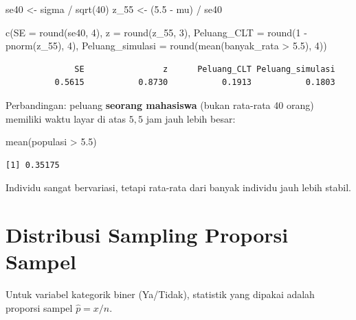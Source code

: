 \documentclass[
  indonesian,
  letterpaper,
]{book}
\newenvironment{Shaded}{\begin{snugshade}}{\end{snugshade}}
\newcommand{\AttributeTok}[1]{\textcolor[rgb]{0.40,0.45,0.13}{#1}}
\newcommand{\DecValTok}[1]{\textcolor[rgb]{0.68,0.00,0.00}{#1}}
\newcommand{\FloatTok}[1]{\textcolor[rgb]{0.68,0.00,0.00}{#1}}
\newcommand{\FunctionTok}[1]{\textcolor[rgb]{0.28,0.35,0.67}{#1}}
\newcommand{\NormalTok}[1]{\textcolor[rgb]{0.00,0.23,0.31}{#1}}
\newcommand{\OtherTok}[1]{\textcolor[rgb]{0.00,0.23,0.31}{#1}}
\newcommand{\SpecialCharTok}[1]{\textcolor[rgb]{0.37,0.37,0.37}{#1}}
\begin{document}
\begin{Shaded}
\begin{Highlighting}[]
\NormalTok{se40 }\OtherTok{\textless{}{-}}\NormalTok{ sigma }\SpecialCharTok{/} \FunctionTok{sqrt}\NormalTok{(}\DecValTok{40}\NormalTok{)}
\NormalTok{z\_55 }\OtherTok{\textless{}{-}}\NormalTok{ (}\FloatTok{5.5} \SpecialCharTok{{-}}\NormalTok{ mu) }\SpecialCharTok{/}\NormalTok{ se40}

\FunctionTok{c}\NormalTok{(}\AttributeTok{SE =} \FunctionTok{round}\NormalTok{(se40, }\DecValTok{4}\NormalTok{),}
  \AttributeTok{z =} \FunctionTok{round}\NormalTok{(z\_55, }\DecValTok{3}\NormalTok{),}
  \AttributeTok{Peluang\_CLT =} \FunctionTok{round}\NormalTok{(}\DecValTok{1} \SpecialCharTok{{-}} \FunctionTok{pnorm}\NormalTok{(z\_55), }\DecValTok{4}\NormalTok{),}
  \AttributeTok{Peluang\_simulasi =} \FunctionTok{round}\NormalTok{(}\FunctionTok{mean}\NormalTok{(banyak\_rata }\SpecialCharTok{\textgreater{}} \FloatTok{5.5}\NormalTok{), }\DecValTok{4}\NormalTok{))}
\end{Highlighting}
\end{Shaded}

\begin{verbatim}
              SE                z      Peluang_CLT Peluang_simulasi 
          0.5615           0.8730           0.1913           0.1803 
\end{verbatim}

Perbandingan: peluang \textbf{seorang mahasiswa} (bukan rata-rata 40
orang) memiliki waktu layar di atas \(5{,}5\) jam jauh lebih besar:

\begin{Shaded}
\begin{Highlighting}[]
\FunctionTok{mean}\NormalTok{(populasi }\SpecialCharTok{\textgreater{}} \FloatTok{5.5}\NormalTok{)}
\end{Highlighting}
\end{Shaded}

\begin{verbatim}
[1] 0.35175
\end{verbatim}

Individu sangat bervariasi, tetapi rata-rata dari banyak individu jauh
lebih stabil.

\section{Distribusi Sampling Proporsi
Sampel}\label{distribusi-sampling-proporsi-sampel}

Untuk variabel kategorik biner (Ya/Tidak), statistik yang dipakai adalah
proporsi sampel \(\hat{p} = x / n\).
\end{document}
